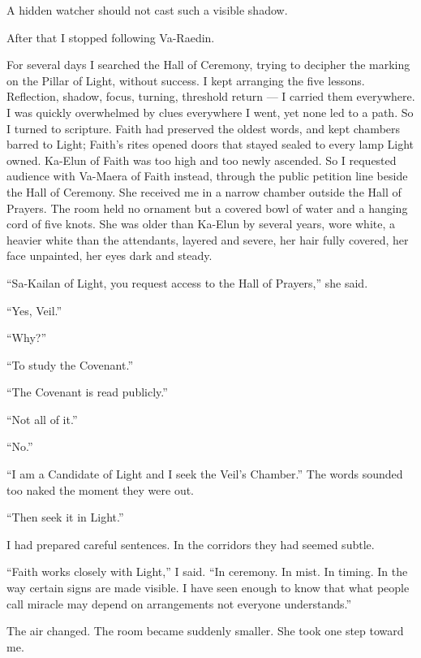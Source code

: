 \begin{scripture}
A hidden watcher should not cast such a visible shadow.
\end{scripture}

After that I stopped following Va-Raedin.\par

For several days I searched the Hall of Ceremony, trying to decipher the marking on the Pillar of Light, without success. I kept arranging the five lessons. Reflection, shadow, focus, turning, threshold return --- I carried them everywhere. I was quickly overwhelmed by clues everywhere I went, yet none led to a path. So I turned to scripture. Faith had preserved the oldest words, and kept chambers barred to Light; Faith's rites opened doors that stayed sealed to every lamp Light owned. Ka-Elun of Faith was too high and too newly ascended. So I requested audience with Va-Maera of Faith instead, through the public petition line beside the Hall of Ceremony. She received me in a narrow chamber outside the Hall of Prayers. The room held no ornament but a covered bowl of water and a hanging cord of five knots. She was older than Ka-Elun by several years, wore white, a heavier white than the attendants, layered and severe, her hair fully covered, her face unpainted, her eyes dark and steady. \par

``Sa-Kailan of Light, you request access to the Hall of Prayers,'' she said.\par
``Yes, Veil.''\par
``Why?''\par
``To study the Covenant.''\par
``The Covenant is read publicly.''\par
``Not all of it.''\par
``No.''\par
``I am a Candidate of Light and I seek the Veil's Chamber.'' The words sounded too naked the moment they were out. \par
``Then seek it in Light.''\par
I had prepared careful sentences. In the corridors they had seemed subtle. \par
``Faith works closely with Light,'' I said. ``In ceremony. In mist. In timing. In the way certain signs are made visible. I have seen enough to know that what people call miracle may depend on arrangements not everyone understands.''\par

The air changed. The room became suddenly smaller. She took one step toward me. \par

